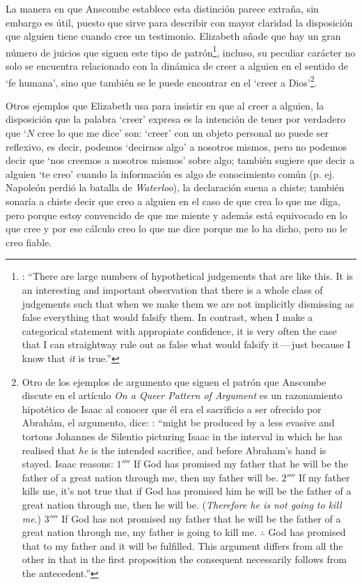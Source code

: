 La manera en que Anscombe establece esta distinción parece extraña, sin embargo es útil, puesto que sirve para describir con mayor claridad la disposición que alguien tiene cuando cree un testimonio. Elizabeth añade que hay un gran número de juicios que siguen este tipo de patrón\footnote{\cite[Cf.~][302]{anscombe2015logic:qpa}: \enquote{There are large numbers of hypothetical judgements that are like this. It is an interesting and important observation that there is a whole class of judgements such that when we make them we are not implicitly dismissing as false everything that would falsify them. In contrast, when I make a categorical statement with appropiate confidence, it is very often the case that I can straightway rule out as false what would falsify it\,---\,just because I know that \emph{it} is true.}}, incluso, su peculiar carácter no solo se encuentra relacionado con la dinámica de creer a alguien en el sentido de `fe humana', sino que también se le puede encontrar en el `creer a Dios'\footnote{Otro de los ejemplos de argumento que siguen el patrón que Anscombe discute en el artículo \emph{On a Queer Pattern of Argument} es un razonamiento hipotético de Isaac al conocer que él era el sacrificio a ser ofrecido por Abrahám, el argumento, dice: \cite[Cf.~][309]{anscombe2015logic:qpa}: \enquote{might be produced by a less evasive and tortous Johannes de Silentio picturing Isaac in the interval in which he has realised that \emph{he} is the intended sacrifice, and before Abraham's hand is stayed. Isaac reasons: $1''''$  If God has promised my father that he will be the father of a great nation through me, then my father will be. $2''''$  If my father kills me, it's not true that if God has promised him he will be the father of a great nation through me, then he will be. (\emph{Therefore he is not going to kill me}.) $3''''$  If God has not promised my father that he will be the father of a great nation through me, my father is going to kill me. $\mathbf{\therefore}$  God has promised that to my father and it will be fulfilled. This argument differs from all the other in that in the first proposition the consequent necessarily follows from the antecedent.}}.

Otros ejemplos que Elizabeth usa para insistir en que al creer a alguien, la disposición que la palabra `creer' expresa es la intención de tener por verdadero que \enquote*{$N$ cree lo que me dice} son: `creer' con un objeto personal no puede ser reflexivo, es decir, podemos `decirnos algo' a nosotros mismos, pero no podemos decir que `nos creemos a nosotros mismos' sobre algo; también sugiere que decir a alguien \enquote*{te creo} cuando la información es algo de conocimiento común (p. ej. Napoleón perdió la batalla de \emph{Waterloo}), la declaración suena a chiste; también sonaría a chiste decir que creo a alguien en el caso de que crea lo que me diga, pero porque estoy convencido de que me miente y además está equivocado en lo que cree y por ese cálculo creo lo que me dice porque me lo ha dicho, pero no le creo fiable.

